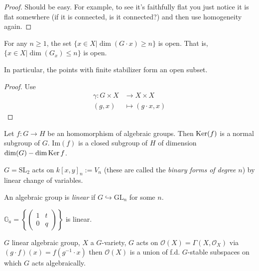\begin{proof}
Should be easy. For example, to see it's
faithfully flat you just notice it is flat
somewhere (if it is connected, is it
connected?) and then use homogeneity again.
\end{proof}

\begin{proposition}
\label{git-label-005}
For any $n \geq 1$, the set $\{x \in
X|\dim(G\cdot x)\geq n\}$ is open. That is,
$\{x \in X|\dim(G_x)\leq n\}$ is open.

In particular, the points with finite
stabilizer form an open subset.
\end{proposition}

\begin{proof}
Use
$$
\begin{aligned}
\gamma: G \times X &\longrightarrow X\times X
\\
(g,x) &\longmapsto (g\cdot x,x)
\end{aligned}
$$
\end{proof}

\begin{lemma}
\label{git-label-019}
Let $f:G \to H$ be an homomorphism of
algebraic groups. Then $\mathop{\mathrm{Ker}} (f)$ is a normal
subgroup of $G$. $\text{Im}(f)$ is a closed
subgroup of $H$ of dimension $\dim(G)-\dim
\mathop{\mathrm{Ker}} f$.
\end{lemma}

\begin{example}
\label{git-label-006}
$G=\text{SL}_2$ acts on $k[x,y]_n:=V_n$
(these are called the {\it binary forms of
degree $n$}) by linear change of variables.
\end{example}

\begin{definition}
\label{definition-linear-algebraic-group}
An algebraic group is {\it linear} if $G
\hookrightarrow \text{GL}_n$ for some $n$.
\end{definition}

\begin{example}
\label{git-label-020}
$\mathbb{G}_a=\left\{\begin{pmatrix} 1&t\\
0&q
\end{pmatrix}\right\}$ is linear.
\end{example}

\begin{proposition}
\label{proposition-co-action}
$G$ linear algebraic group,  $X$ a
$G$-variety, $G$ acts on
$\mathcal{O}(X)=\Gamma(X,\mathcal{O}_X)$ via
$(g\cdot f)(x)=f(g^{-1}\cdot x)$ then
$\mathcal{O}(X)$ is a union of f.d.
$G$-stable subspaces on which $G$ acts
algebraically.
\end{proposition}

